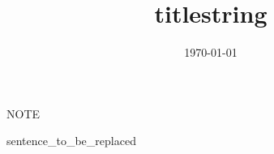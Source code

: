 \documentclass[a4paper,12pt]{scrartcl}
\begin{document}
\title{titlestring}
\author{}
\date{\today}
\maketitle

\listoffigures

\clearpage

NOTE \\ 

\begin{flushleft}
sentence_to_be_replaced
\end{flushleft}

\clearpage

\end{document}
